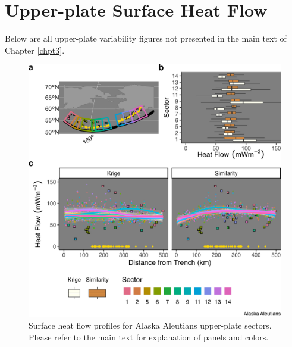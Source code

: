 \clearpage

\hypertarget{lateralDiffAppendix}{%
\section{Upper-plate Surface Heat Flow}\label{lateralDiffAppendix}}

Below are all upper-plate variability figures not presented in the main text of Chapter \ref{chpt3}.

\begin{figure}[htbp]

{\centering \includegraphics[width=1\linewidth,]{assets/figs/chpt3/AlaskaAleutiansUpperPlate} 

}

\caption[Surface heat flow profiles for Alaska Aleutians upper-plate sectors]{Surface heat flow profiles for Alaska Aleutians upper-plate sectors. Please refer to the main text for explanation of panels and colors.}\label{fig:alaskaAleutiansUpper}
\end{figure}

